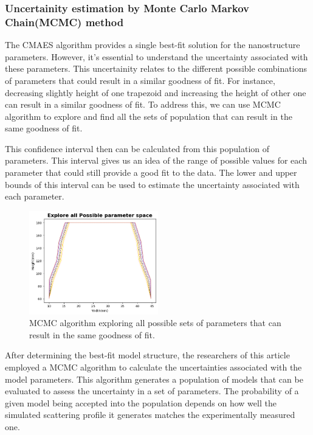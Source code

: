 \subsubsection{Uncertainity estimation by Monte Carlo Markov Chain(MCMC) method}
\label{sec:mcmc_cd-saxs}

The CMAES algorithm provides a single best-fit solution for the nanostructure parameters. However, it's essential to understand the uncertainty associated with these parameters.
This uncertainity relates to the different possible combinations of parameters that could result in a similar goodness of fit. 
For instance, decreasing slightly height of one trapezoid and increasing the height of other one can result in a similar goodness of fit.
To address this, we can use MCMC algorithm to explore and find all the sets of population that can result in the same goodness of fit.

\medskip

This confidence interval then can be calculated from this population of parameters. This interval gives us an idea of the range of possible values for each parameter that could still provide a good fit to the data.
The lower and upper bounds of this interval can be used to estimate the uncertainty associated with each parameter.

\begin{figure}[h]
    \centering
    \includegraphics[width=0.5\textwidth]{images/mcmc.png}
    \caption{MCMC algorithm exploring all possible sets of parameters that can result in the same goodness of fit.}
\end{figure}
\medskip

After determining the best-fit model structure, the researchers of this article \cite{sunday2016evaluation}
employed a MCMC algorithm to calculate the uncertainties associated with the model parameters.
This algorithm generates a population of models that can be evaluated to assess the uncertainty
in a set of parameters. The probability of a given model being accepted into the population
depends on how well the simulated scattering profile it generates matches the experimentally
measured one.

